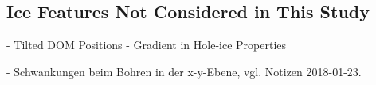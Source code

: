 
\subsection{Ice Features Not Considered in This Study}
\label{sec:ice_features_not_considered}

- Tilted DOM Positions
- Gradient in Hole-ice Properties

- Schwankungen beim Bohren in der x-y-Ebene, vgl. Notizen 2018-01-23.